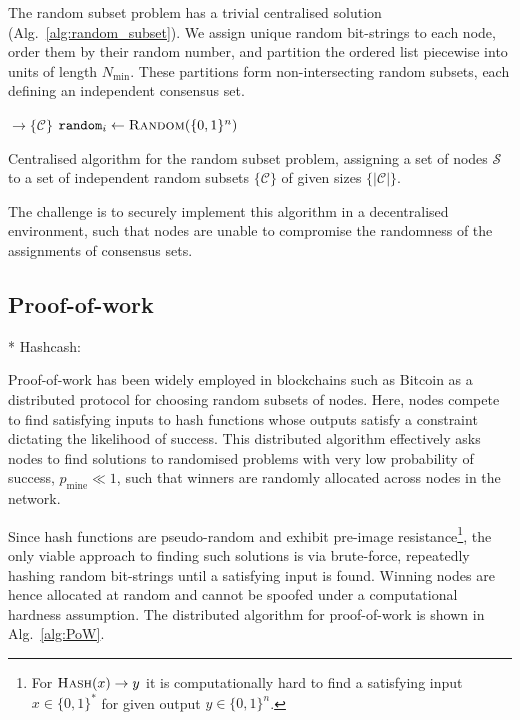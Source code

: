 The random subset problem has a trivial centralised solution (Alg.~\ref{alg:random_subset}). We assign unique random bit-strings to each node, order them by their random number, and partition the ordered list piecewise into units of length $N_\mathrm{min}$. These partitions form non-intersecting random subsets, each defining an independent consensus set.

\begin{algorithm}[H]
	\begin{algorithmic}
		 $\to \{\mathcal{C}\}$
		\State $\mathtt{random}_i \gets \textsc{Random}(\{0,1\}^n)$	\EndFor
		\State {}
		\EndFunction
	\end{algorithmic}
	\caption{Centralised algorithm for the random subset problem, assigning a set of nodes $\mathcal{S}$ to a set of independent random subsets $\{\mathcal{C}\}$ of given sizes $\{|\mathcal{C}|\}$.} \label{alg:random_subset}
\end{algorithm}

The challenge is to securely implement this algorithm in a decentralised environment, such that nodes are unable to compromise the randomness of the assignments of consensus sets.

\subsection{Proof-of-work} \label{sec:PoW}

* Hashcash: \cite{pow_email, hashcash}

Proof-of-work has been widely employed in blockchains such as Bitcoin \cite{Nakamoto08} as a distributed protocol for choosing random subsets of nodes. Here, nodes compete to find satisfying inputs to hash functions whose outputs satisfy a constraint dictating the likelihood of success. This distributed algorithm effectively asks nodes to find solutions to randomised problems with very low probability of success, $p_\mathrm{mine}\ll 1$, such that winners are randomly allocated across nodes in the network.

Since hash functions are pseudo-random and exhibit pre-image resistance\footnote{For $\textsc{Hash}(x)\to y$ it is computationally hard to find a satisfying input $x\in\{0,1\}^*$ for given output $y\in\{0,1\}^n$.}, the only viable approach to finding such solutions is via brute-force, repeatedly hashing random bit-strings until a satisfying input is found. Winning nodes are hence allocated at random and cannot be spoofed under a computational hardness assumption. The distributed algorithm for proof-of-work is shown in Alg.~\ref{alg:PoW}.


